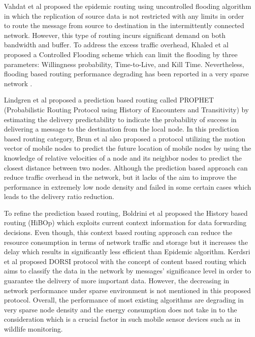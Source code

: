 \documentclass[conference]{IEEEtran}
\begin{document}
Vahdat et al \cite{Vahdat2000} proposed the epidemic routing using  uncontrolled flooding algorithm in which the replication of source data is not restricted with any limits in order to route the message from source to destination in the intermittently connected network.
However, this type of routing incurs significant demand on both bandwidth and buffer.
To address the excess traffic overhead, Khaled et al \cite{Harras2005} proposed a Controlled Flooding  scheme which can limit the flooding by three parameters: Willingness probability, Time-to-Live, and Kill Time.
Nevertheless, flooding based routing performance degrading has been reported in a very sparse network \cite{Neena2013}.

Lindgren et al \cite{Lindgren2003} proposed a prediction based routing called PROPHET (Probabilistic Routing Protocol using History of Encounters and Transitivity) by estimating the delivery predictability to indicate the probability of success in delivering a message to the destination from the local node.
In this prediction based routing category, Brun et al \cite{Brendan2005}  also proposed a protocol utilizing the motion vector of mobile nodes to predict the future location of mobile nodes by using the knowledge of relative velocities of a node and its neighbor nodes to predict the closest distance between two nodes.
Although the prediction based approach can reduce traffic overhead in the network, but it lacks of the aim to improve the performance in extremely low node density and failed in some certain cases which leads to the delivery ratio reduction.

To refine the prediction based routing,  Boldrini et al \cite{Boldrini2007}  proposed the History based routing (HiBOp) which exploits current context information for data forwarding decisions.
Even though, this context based routing approach can reduce the resource consumption in terms of network traffic and storage but it increases the delay which results in significantly less efficient than Epidemic algorithm.
Kerdsri et al \cite{Kerdsri2013} proposed DORSI protocol with the concept of content based routing which aims to classify the data in the network by messages' significance level in order to guarantee the delivery of more important data. 
However, the decreasing in network performance under sparse environment is not mentioned in this proposed protocol.
Overall, the performance of most existing algorithms are degrading in very sparse node density and the energy consumption does not take in to the consideration which is a crucial factor in such mobile sensor devices such as in wildlife monitoring.
\end{document}
